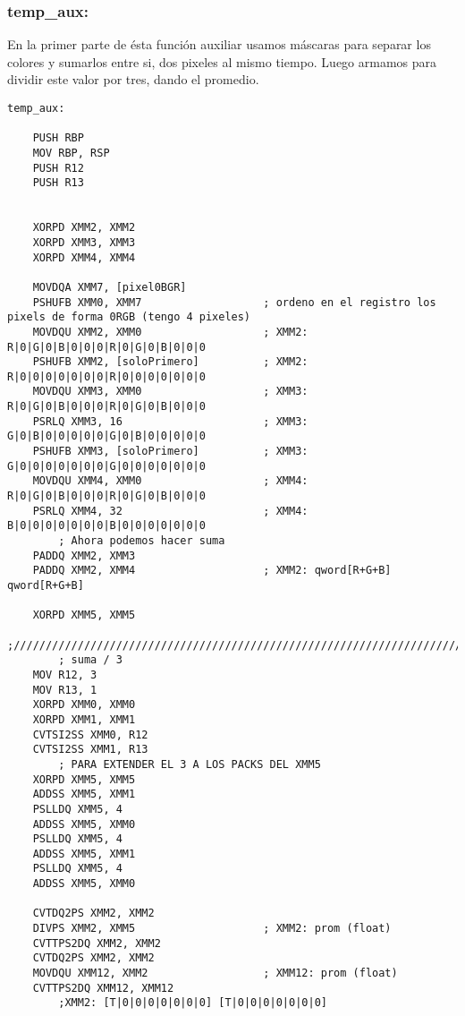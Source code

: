 \subsubsection{temp_aux:}

En la primer parte de \'esta funci\'on auxiliar usamos m\'ascaras para separar los colores y sumarlos entre si, dos pixeles al mismo tiempo.
Luego armamos para dividir este valor por tres, dando el promedio.
\begin{codesnippet}
\begin{verbatim}
temp_aux:
    
    PUSH RBP					
    MOV RBP, RSP
    PUSH R12
    PUSH R13
    
    
    XORPD XMM2, XMM2
    XORPD XMM3, XMM3
    XORPD XMM4, XMM4
    
    MOVDQA XMM7, [pixel0BGR]
    PSHUFB XMM0, XMM7		 			; ordeno en el registro los pixels de forma 0RGB (tengo 4 pixeles)
    MOVDQU XMM2, XMM0					; XMM2: R|0|G|0|B|0|0|0|R|0|G|0|B|0|0|0	
    PSHUFB XMM2, [soloPrimero]			; XMM2: R|0|0|0|0|0|0|0|R|0|0|0|0|0|0|0
    MOVDQU XMM3, XMM0					; XMM3: R|0|G|0|B|0|0|0|R|0|G|0|B|0|0|0 	
    PSRLQ XMM3, 16						; XMM3: G|0|B|0|0|0|0|0|G|0|B|0|0|0|0|0		
    PSHUFB XMM3, [soloPrimero]			; XMM3: G|0|0|0|0|0|0|0|G|0|0|0|0|0|0|0
    MOVDQU XMM4, XMM0					; XMM4: R|0|G|0|B|0|0|0|R|0|G|0|B|0|0|0 	
    PSRLQ XMM4, 32						; XMM4: B|0|0|0|0|0|0|0|B|0|0|0|0|0|0|0
        ; Ahora podemos hacer suma
    PADDQ XMM2, XMM3
    PADDQ XMM2, XMM4					; XMM2: qword[R+G+B] qword[R+G+B] 
    
    XORPD XMM5, XMM5
    ;///////////////////////////////////////////////////////////////////////////////////////////////////
        ; suma / 3
    MOV R12, 3
    MOV R13, 1
    XORPD XMM0, XMM0
    XORPD XMM1, XMM1
    CVTSI2SS XMM0, R12
    CVTSI2SS XMM1, R13
        ; PARA EXTENDER EL 3 A LOS PACKS DEL XMM5
    XORPD XMM5, XMM5
    ADDSS XMM5, XMM1
    PSLLDQ XMM5, 4
    ADDSS XMM5, XMM0
    PSLLDQ XMM5, 4
    ADDSS XMM5, XMM1
    PSLLDQ XMM5, 4
    ADDSS XMM5, XMM0
    
    CVTDQ2PS XMM2, XMM2
    DIVPS XMM2, XMM5					; XMM2: prom (float)
    CVTTPS2DQ XMM2, XMM2
    CVTDQ2PS XMM2, XMM2
    MOVDQU XMM12, XMM2					; XMM12: prom (float)
    CVTTPS2DQ XMM12, XMM12
        ;XMM2: [T|0|0|0|0|0|0|0] [T|0|0|0|0|0|0|0]
\end{verbatim}
\end{codesnippet}

